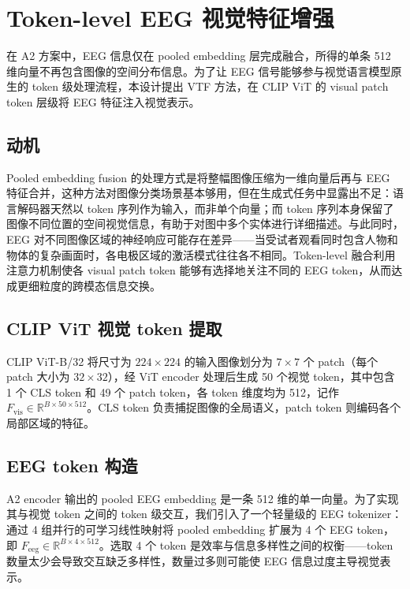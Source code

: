\section{Token-level EEG 视觉特征增强}

在 A2 方案中，EEG 信息仅在 pooled embedding 层完成融合，所得的单条 512 维向量不再包含图像的空间分布信息。为了让 EEG 信号能够参与视觉语言模型原生的 token 级处理流程，本设计提出 VTF 方法，在 CLIP ViT 的 visual patch token 层级将 EEG 特征注入视觉表示。

\subsection{动机}

Pooled embedding fusion 的处理方式是将整幅图像压缩为一维向量后再与 EEG 特征合并，这种方法对图像分类场景基本够用，但在生成式任务中显露出不足：语言解码器天然以 token 序列作为输入，而非单个向量；而 token 序列本身保留了图像不同位置的空间视觉信息，有助于对图中多个实体进行详细描述。与此同时，EEG 对不同图像区域的神经响应可能存在差异——当受试者观看同时包含人物和物体的复杂画面时，各电极区域的激活模式往往各不相同。Token-level 融合利用注意力机制使各 visual patch token 能够有选择地关注不同的 EEG token，从而达成更细粒度的跨模态信息交换。

\subsection{CLIP ViT 视觉 token 提取}

CLIP ViT-B/32 将尺寸为 $224\times224$ 的输入图像划分为 $7\times7$ 个 patch（每个 patch 大小为 $32\times32$），经 ViT encoder 处理后生成 50 个视觉 token，其中包含 1 个 CLS token 和 49 个 patch token，各 token 维度均为 512，记作 $F_{\mathrm{vis}} \in \mathbb{R}^{B\times50\times512}$。CLS token 负责捕捉图像的全局语义，patch token 则编码各个局部区域的特征。

\subsection{EEG token 构造}

A2 encoder 输出的 pooled EEG embedding 是一条 512 维的单一向量。为了实现其与视觉 token 之间的 token 级交互，我们引入了一个轻量级的 EEG tokenizer：通过 4 组并行的可学习线性映射将 pooled embedding 扩展为 4 个 EEG token，即 $F_{\mathrm{eeg}} \in \mathbb{R}^{B\times4\times512}$。选取 4 个 token 是效率与信息多样性之间的权衡——token 数量太少会导致交互缺乏多样性，数量过多则可能使 EEG 信息过度主导视觉表示。

